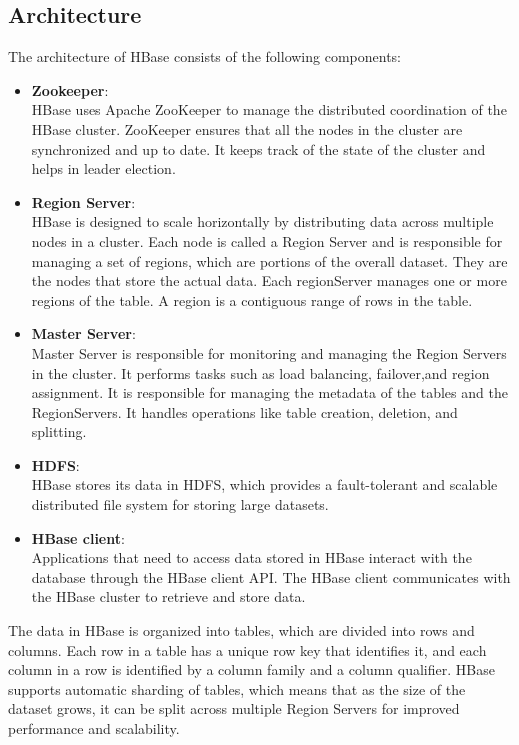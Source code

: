\documentclass[12pt]{article}
\begin{document}
\subsection{Architecture}
The architecture of HBase consists of the following components: 
\begin{itemize}
    \item {\bfseries Zookeeper}: \\
    HBase uses Apache ZooKeeper to manage the distributed coordination of the HBase cluster. ZooKeeper ensures that all the nodes in the cluster are synchronized and up to date. It keeps track of the state of the cluster and helps in leader election.
    \item {\bfseries Region Server}: \\
    HBase is designed to scale horizontally by distributing data across multiple nodes in a cluster. Each node is called a Region Server and is responsible for managing a set of regions, which are portions of the overall dataset. They are the nodes that store the actual data. Each regionServer manages one or more regions of the table. A region is a contiguous range of rows in the table.
    \item {\bfseries Master Server}:\\
    Master Server is responsible for monitoring and managing the Region Servers in the cluster. It performs tasks such as load balancing, failover,and region assignment. It is responsible for managing the metadata of the tables and the RegionServers. It handles operations like table creation, deletion, and splitting.
    \item {\bfseries HDFS}:\\
    HBase stores its data in HDFS, which provides a fault-tolerant and scalable distributed file system for storing large datasets.
    \item {\bfseries HBase client}:\\
    Applications that need to access data stored in HBase interact with the database through the HBase client API. The HBase client communicates with the HBase cluster to retrieve and store data.
\end{itemize}

The data in HBase is organized into tables, which are divided into rows and columns. Each row in a table has a unique row key that identifies it, and each column in a row is identified by a column family and a column qualifier. HBase supports automatic sharding of tables, which means that as the size of the dataset grows, it can be split across multiple Region Servers for improved performance and scalability.
\end{document}
